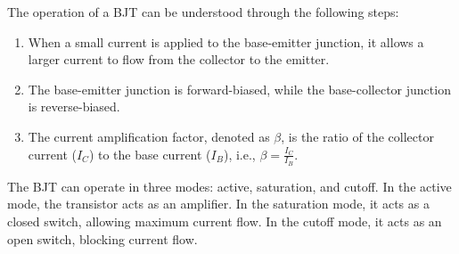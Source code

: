 The operation of a BJT can be understood through the following steps:
\begin{enumerate}
    \item When a small current is applied to the base-emitter junction, it allows a larger current to flow from the collector to the emitter.
    \item The base-emitter junction is forward-biased, while the base-collector junction is reverse-biased.
    \item The current amplification factor, denoted as $\beta$, is the ratio of the collector current ($I_C$) to the base current ($I_B$), i.e., $\beta = \frac{I_C}{I_B}$.
\end{enumerate}

The BJT can operate in three modes: active, saturation, and cutoff. In the active mode, the transistor acts as an amplifier. In the saturation mode, it acts as a closed switch, allowing maximum current flow. In the cutoff mode, it acts as an open switch, blocking current flow.

